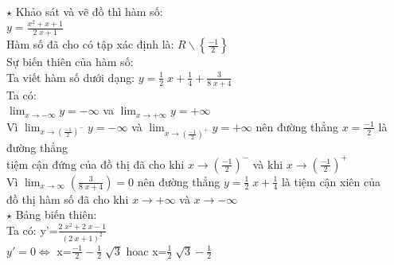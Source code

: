 \documentclass[17pt]{extarticle}
\begin{document}
\everymath{\displaystyle}
$\star$ Khảo sát và vẽ đồ thì hàm số: \\
$y=\frac{x^{2} + x + 1}{2 \; x + 1}$\\
 Hàm số đã cho có tập xác định là: $R\backslash\left\{\frac{-1}{2}\right\}$\\
 Sự biến thiên của hàm số:\\
	Ta viết hàm số dưới dạng: $y=\frac{1}{2} \; x + \frac{1}{4}+\frac{3}{8 \; x + 4}$\\
 Ta có: \\
$\lim_{x\to -\infty }y=-\infty$ va $\lim_{x\to+\infty }y=+\infty$\\
 Vì $\lim_{x\to(\frac{-1}{2})^{-} }y=-\infty$ và $\lim_{x\to(\frac{-1}{2})^{+} }y=+\infty$ nên đường thẳng $x=\frac{-1}{2}$ là đường thẳng\\
tiệm cận đứng của đồ thị đã cho khi $x\to(\frac{-1}{2})^{-}$ và khi $x\to(\frac{-1}{2})^{+}$\\
 Vì $\lim_{x\to\infty}(\frac{3}{8 \; x + 4})=0$ nên đường thẳng $y=\frac{1}{2} \; x + \frac{1}{4}$ là tiệm cận xiên của\\
 đồ thị hàm số đã cho khi $x\to+\infty$ và $x\to-\infty$\\
$\star$ Bảng biến thiên:\\
 Ta có: y'=$\frac{2 \; x^{2} + 2 \; x - 1}{\left(2 \; x + 1\right)^{2}}$ \\
	$y'=0 \Leftrightarrow$ x=$\frac{-1}{2} - \frac{1}{2} \; \sqrt{3}$ hoac x=$\frac{1}{2} \; \sqrt{3} - \frac{1}{2}$ \\
\end{document}

